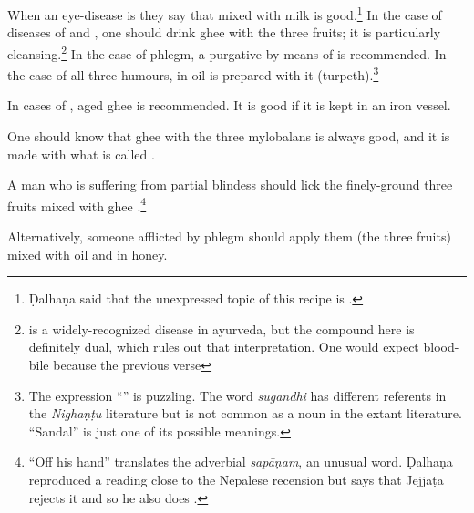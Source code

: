 \begin{translation}
    When an eye-disease is  they say that
     mixed with milk is good.\footnote{Ḍalhaṇa said
    that the unexpressed topic of this recipe is .} In
    the case of diseases of  and , one should drink
    ghee with the three fruits; it is particularly
    cleansing.\footnote{ is a
    widely-recognized disease in ayurveda, but the compound here is definitely dual,
    which rules out that interpretation. One would expect blood-bile because the
    previous verse } In the case of phlegm, a purgative by means of
     is recommended. In the case of all three humours,
     in oil is prepared with it (turpeth).\footnote{The expression 
    “” is puzzling. The word \emph{sugandhi} 
    has different referents in the \emph{Nighaṇṭu} literature but is not common as a 
    noun in the extant literature. “Sandal” is just one of its possible meanings.}
    
    \item[28]
    
    In cases of , aged ghee is recommended.  It is good if 
    it is kept in an iron vessel.
    
    \item [28cd--29ab]
    
    One should know that ghee with the three mylobalans is always good, and it is made
    with what is called .
    
    A man who is suffering from partial blindess should lick the finely-ground three fruits 
    mixed with ghee .\footnote{“Off his hand” translates the 
    adverbial \emph{sapāṇam}, an unusual word. Ḍalhaṇa reproduced a reading close 
    to the Nepalese recension but says that Jejjaṭa rejects it and so he also does 
    \citep[627]{vulgate}.}
    
    \item[29cd]
    
    Alternatively, someone afflicted by phlegm should apply them (the three fruits)
    mixed with oil and  in honey.
    
    \item[30]
    

\end{translation}
